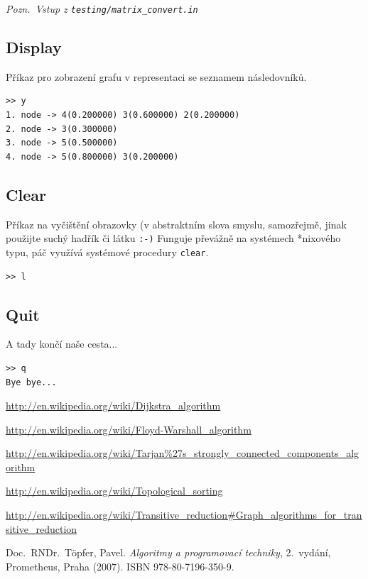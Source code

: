 \documentclass[11pt,a4paper]{article}
\begin{document}
{\noindent \sl Pozn.~Vstup z \tt testing/matrix\_convert.in}

\subsection{Display}
Příkaz pro zobrazení grafu v representaci se seznamem následovníků.



\begin{verbatim}
>> y
1. node -> 4(0.200000) 3(0.600000) 2(0.200000)
2. node -> 3(0.300000)
3. node -> 5(0.500000)
4. node -> 5(0.800000) 3(0.200000)
\end{verbatim}

\subsection{Clear}
Příkaz na vyčištění obrazovky (v abstraktním slova smyslu, samozřejmě, jinak
použijte suchý hadřík či látku {\tt :-)}
Funguje převážně na systémech *nixového typu, páč využívá systémové procedury
\verb=clear=.

\begin{verbatim}
>> l
\end{verbatim}

\subsection{Quit}
A tady končí naše cesta...

\begin{verbatim}
>> q
Bye bye...
\end{verbatim}

\pagebreak

\begin{thebibliography}{9}

\url{http://en.wikipedia.org/wiki/Dijkstra\_algorithm}

\url{http://en.wikipedia.org/wiki/Floyd-Warshall\_algorithm}

\url{http://en.wikipedia.org/wiki/Tarjan\%27s\_strongly\_connected\_components\_algorithm}

\url{http://en.wikipedia.org/wiki/Topological\_sorting}

\url{http://en.wikipedia.org/wiki/Transitive\_reduction#Graph\_algorithms\_for\_transitive\_reduction}

Doc.~RNDr.~T\"opfer, Pavel. \textsl{Algoritmy a programovací techniky},
2.~vydání, Prometheus, Praha (2007). ISBN 978-80-7196-350-9.

\end{thebibliography}
\end{document}
